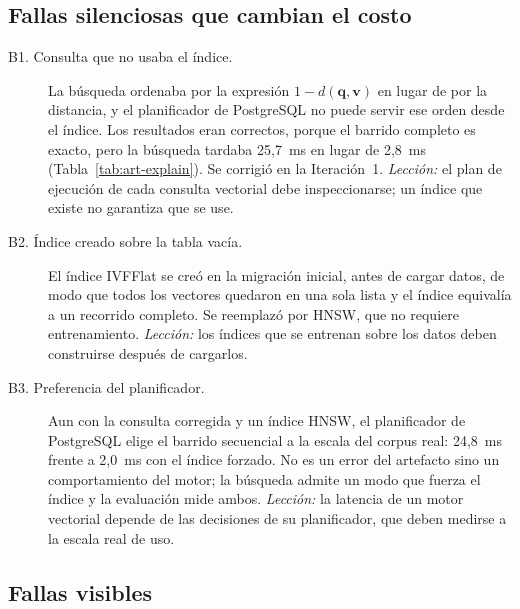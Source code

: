 \subsection{Fallas silenciosas que cambian el costo}

\begin{description}
    \item[B1. Consulta que no usaba el índice.] La búsqueda ordenaba por la expresión $1 - d(\mathbf{q}, \mathbf{v})$ en lugar de por la distancia, y el planificador de PostgreSQL no puede servir ese orden desde el índice. Los resultados eran correctos, porque el barrido completo es exacto, pero la búsqueda tardaba 25,7~ms en lugar de 2,8~ms (Tabla~\ref{tab:art-explain}). Se corrigió en la Iteración~1. \emph{Lección:} el plan de ejecución de cada consulta vectorial debe inspeccionarse; un índice que existe no garantiza que se use.
    \item[B2. Índice creado sobre la tabla vacía.] El índice IVFFlat se creó en la migración inicial, antes de cargar datos, de modo que todos los vectores quedaron en una sola lista y el índice equivalía a un recorrido completo. Se reemplazó por HNSW, que no requiere entrenamiento. \emph{Lección:} los índices que se entrenan sobre los datos deben construirse después de cargarlos.
    \item[B3. Preferencia del planificador.] Aun con la consulta corregida y un índice HNSW, el planificador de PostgreSQL elige el barrido secuencial a la escala del corpus real: 24,8~ms frente a 2,0~ms con el índice forzado. No es un error del artefacto sino un comportamiento del motor; la búsqueda admite un modo que fuerza el índice y la evaluación mide ambos. \emph{Lección:} la latencia de un motor vectorial depende de las decisiones de su planificador, que deben medirse a la escala real de uso.
\end{description}

\subsection{Fallas visibles}

